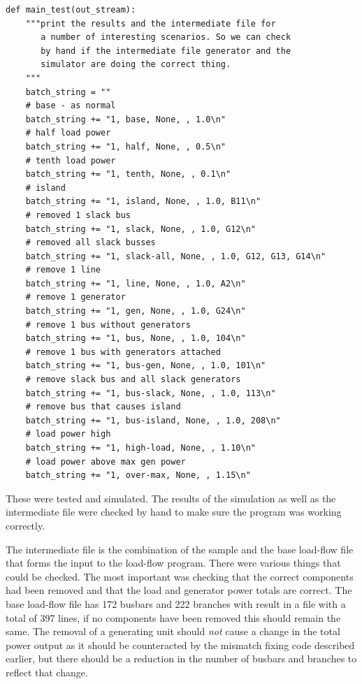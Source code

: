 \documentclass[a4paper,oneside,12pt]{report}
\begin{document}
\begin{verbatim}
def main_test(out_stream):
    """print the results and the intermediate file for
       a number of interesting scenarios. So we can check
       by hand if the intermediate file generator and the
       simulator are doing the correct thing.
    """
    batch_string = ""
    # base - as normal
    batch_string += "1, base, None, , 1.0\n"            
    # half load power
    batch_string += "1, half, None, , 0.5\n"            
    # tenth load power
    batch_string += "1, tenth, None, , 0.1\n"           
    # island
    batch_string += "1, island, None, , 1.0, B11\n"     
    # removed 1 slack bus
    batch_string += "1, slack, None, , 1.0, G12\n"      
    # removed all slack busses
    batch_string += "1, slack-all, None, , 1.0, G12, G13, G14\n"  
    # remove 1 line
    batch_string += "1, line, None, , 1.0, A2\n"        
    # remove 1 generator
    batch_string += "1, gen, None, , 1.0, G24\n"        
    # remove 1 bus without generators
    batch_string += "1, bus, None, , 1.0, 104\n"        
    # remove 1 bus with generators attached
    batch_string += "1, bus-gen, None, , 1.0, 101\n"    
    # remove slack bus and all slack generators
    batch_string += "1, bus-slack, None, , 1.0, 113\n"  
    # remove bus that causes island
    batch_string += "1, bus-island, None, , 1.0, 208\n" 
    # load power high 
    batch_string += "1, high-load, None, , 1.10\n"      
    # load power above max gen power
    batch_string += "1, over-max, None, , 1.15\n"       
\end{verbatim}

These were tested and simulated. The results of the simulation as well
as the intermediate file were checked by hand to make sure the program
was working correctly.

The intermediate file is the combination of the sample and the base
load-flow file that forms the input to the load-flow program. There were
various things that could be checked. The most important was checking
that the correct components had been removed and that the load and
generator power totals are correct. The base load-flow file has 172
busbars and 222 branches with result in a file with a total of 397
lines, if no components have been removed this should remain the same.
The removal of a generating unit should \emph{not} cause a change in the
total power output as it should be counteracted by the mismatch fixing
code described earlier, but there should be a reduction in the number of
busbars and branches to reflect that change.
\end{document}

